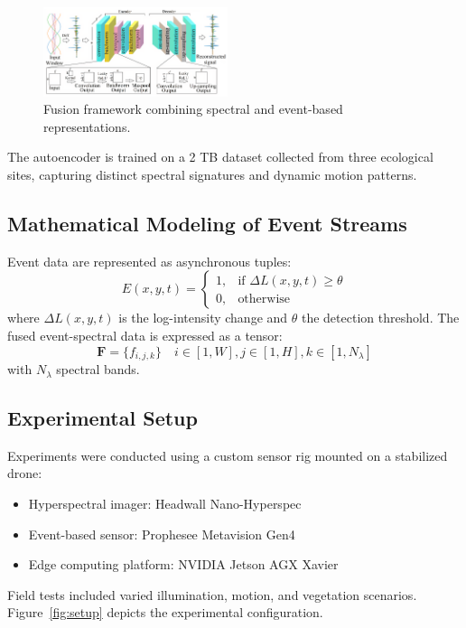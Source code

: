 \documentclass[conference]{IEEEtran}
\begin{document}
\begin{figure}[H]
    \centering
    \includegraphics[width=0.48\textwidth]{Fusion framework.png}
    \caption{Fusion framework combining spectral and event-based representations.}
\end{figure}

The autoencoder is trained on a 2 TB dataset collected from three ecological sites, capturing distinct spectral signatures and dynamic motion patterns.

\subsection{Mathematical Modeling of Event Streams}
Event data are represented as asynchronous tuples:
\begin{equation}
E(x,y,t) = 
\begin{cases}
1, & \text{if } \Delta L(x,y,t) \geq \theta \\
0, & \text{otherwise}
\end{cases}
\end{equation}
where \(\Delta L(x,y,t)\) is the log-intensity change and \(\theta\) the detection threshold. The fused event-spectral data is expressed as a tensor:
\[
\mathbf{F} = \{f_{i,j,k}\} \quad i \in [1,W], j \in [1,H], k \in [1,N_\lambda]
\]
with \(N_\lambda\) spectral bands.

\subsection{Experimental Setup}
Experiments were conducted using a custom sensor rig mounted on a stabilized drone:
\begin{itemize}
    \item Hyperspectral imager: Headwall Nano-Hyperspec
    \item Event-based sensor: Prophesee Metavision Gen4
    \item Edge computing platform: NVIDIA Jetson AGX Xavier
\end{itemize}

Field tests included varied illumination, motion, and vegetation scenarios. Figure~\ref{fig:setup} depicts the experimental configuration.
\end{document}
